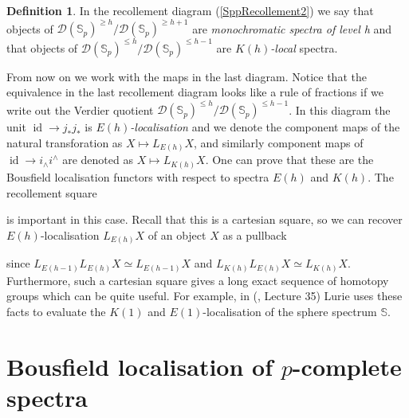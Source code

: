 \documentclass[a4paper]{article} %
\theoremstyle{definition}
\newtheorem{definition}[theorem]{Definition}
\newcommand{\Sph}{\mathbb{S}}
\newcommand{\Spp}{\mathcal{D}(\mathbb{S}_p)}
\begin{document}
\begin{definition}
In the recollement diagram (\ref{SppRecollement2}) we say that objects of $\Spp^{\ge h}/\Spp^{\ge h+1}$ are \textit{monochromatic spectra of level h} and that objects of $\Spp^{\le h}/\Spp^{\le h-1}$ are $K(h)$\textit{-local} spectra.
\end{definition}
From now on we work with the maps in the last diagram. Notice that the equivalence in the last recollement diagram looks like a rule of fractions if we write out the Verdier quotient $\Spp^{\le h} / \Spp^{\le h -1}$. In this diagram the unit $\operatorname{id} \to j_*j_*$ is $E(h)$\textit{-localisation} and we denote the component maps of the natural transforation as $X \mapsto L_{E(h)}X$, and similarly component maps of $\operatorname{id} \to i_\wedge i^\wedge$ are denoted as $X \mapsto L_{K(h)}X$. One can prove that these are the Bousfield localisation functors with respect to spectra $E(h)$ and $K(h)$. The recollement square
\begin{center}
\end{center}
is important in this case. Recall that this is a cartesian square, so we can recover $E(h)$-localisation $L_{E(h)}X$ of an object $X$ as a pullback
\begin{center}
\end{center}
since $L_{E(h-1)}L_{E(h)}X \simeq L_{E(h-1)}X$ and $L_{K(h)}L_{E(h)}X \simeq L_{K(h)}X$. Furthermore, such a cartesian square gives a long exact sequence of homotopy groups which can be quite useful. For example, in (\cite{luriechromatichomotopytheorynotes}, Lecture 35) Lurie uses these facts to evaluate the $K(1)$ and $E(1)$-localisation of the sphere spectrum $\Sph$.

\section{Bousfield localisation of $p$-complete spectra}\label{Section:bousfieldlocal}
\end{document}
